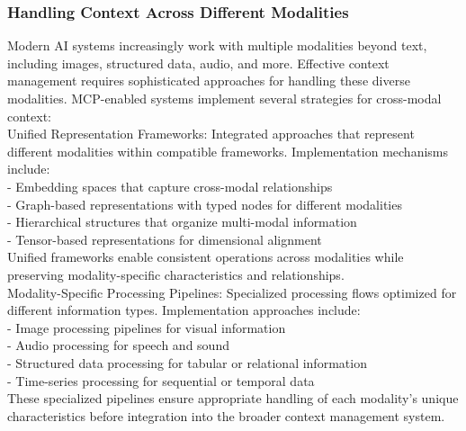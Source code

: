 \subsubsection{Handling Context Across Different Modalities}
Modern AI systems increasingly work with multiple modalities beyond text, including images, structured data, audio, and more. Effective context management requires sophisticated approaches for handling these diverse modalities. MCP-enabled systems implement several strategies for cross-modal context:\\ \newline
Unified Representation Frameworks: Integrated approaches that represent different modalities within compatible frameworks. Implementation mechanisms include:\\ \newline
- Embedding spaces that capture cross-modal relationships\\ \newline
- Graph-based representations with typed nodes for different modalities\\ \newline
- Hierarchical structures that organize multi-modal information\\ \newline
- Tensor-based representations for dimensional alignment\\ \newline
Unified frameworks enable consistent operations across modalities while preserving modality-specific characteristics and relationships.\\ \newline
Modality-Specific Processing Pipelines: Specialized processing flows optimized for different information types. Implementation approaches include:\\ \newline
- Image processing pipelines for visual information\\ \newline
- Audio processing for speech and sound\\ \newline
- Structured data processing for tabular or relational information\\ \newline
- Time-series processing for sequential or temporal data\\ \newline
These specialized pipelines ensure appropriate handling of each modality's unique characteristics before integration into the broader context management system.\\ \newline
